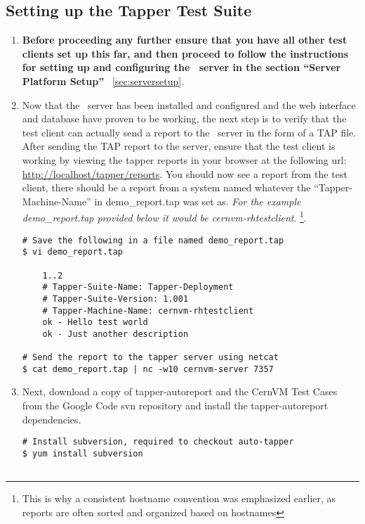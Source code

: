 \newpage
\subsection{Setting up the Tapper Test Suite}
\label{sec:rhtestsuite}
\begin{enumerate}
\item 	{\bf Before proceeding any further ensure that you have all other test clients set up this far, and then proceed
		to follow the instructions for setting up and configuring the \tapper~server in the section ``Server Platform Setup''}		
		~\ref{sec:serversetup}.
		
\item 	Now that the \tapper~server has been installed and configured and the \tapper web interface and database have proven
		to be working, the next step is to verify that the test client can actually send a report to the \tapper~server in
		the form of a TAP file. After sending the TAP report to the server, ensure that the test client is working by viewing 
		the tapper reports in your browser at the following url: \url{http://localhost/tapper/reports}. You should now see a 
		report from the test client, there should be a report from a system named whatever the ``Tapper-Machine-Name'' in 
		demo\_report.tap was set as. \emph{For the example demo\_report.tap provided below it would be cernvm-rhtestclient}.
		\footnote{This is why a consistent hostname convention was emphasized earlier, as reports are often sorted and organized 
		based on hostnames}.
		
\lstset{language=bash,caption=Send a Basic Report to the \tapper~Server}
\begin{lstlisting}
# Save the following in a file named demo_report.tap
$ vi demo_report.tap

	1..2
	# Tapper-Suite-Name: Tapper-Deployment
	# Tapper-Suite-Version: 1.001
	# Tapper-Machine-Name: cernvm-rhtestclient
	ok - Hello test world
	ok - Just another description

# Send the report to the tapper server using netcat
$ cat demo_report.tap | nc -w10 cernvm-server 7357
\end{lstlisting}

\item 	Next, download a copy of tapper-autoreport and the CernVM Test Cases from the Google Code svn repository
		\cite{GCreleasetesting} and install the tapper-autoreport dependencies.
		
\lstset{language=bash,caption=Install \tapper~AutoReport and Dependencies}
\begin{lstlisting}
# Install subversion, required to checkout auto-tapper
$ yum install subversion


\end{lstlisting}
\end{enumerate}
